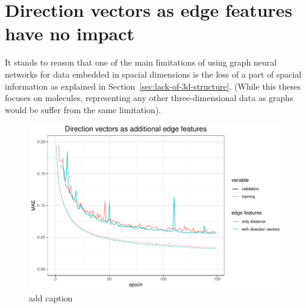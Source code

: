 \section{Direction vectors as edge features have no impact}
\label{sec:direction-vectors}

It stands to reason that one of the main limitations of using graph neural networks for data embedded in spacial dimensions is the loss of a part of spacial information as explained in Section~\ref{sec:lack-of-3d-structure}. (While this theses focuses on molecules, representing any other three-dimensional data as graphs would be suffer from the same limitation). 


\begin{figure}[H]
	\includegraphics[width=\linewidth]{figures/edge-direction-vectors}
	\caption{add caption}
	\label{fig:edge-direction-vectors}
\end{figure}


% 
	
	









